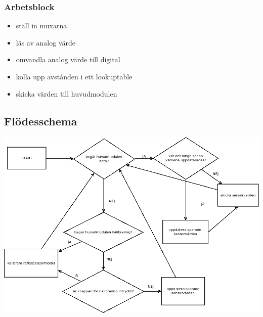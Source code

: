 \subsubsection{Arbetsblock}
\begin{itemize}
\item ställ in muxarna
\item läs av analog värde
\item omvandla analog värde till digital
\item kolla upp avstånden i ett lookuptable
\item skicka värden till huvudmodulen
\end{itemize}
\subsection{Flödesschema}
\centerline{\includegraphics[scale=0.5]{sensorflow}}


%